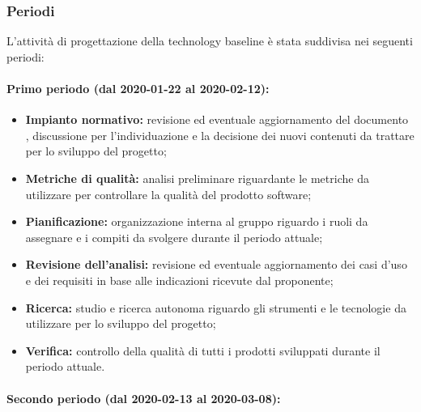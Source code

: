 			\subsubsection{Periodi}
			
				L'attività di progettazione della technology baseline è stata suddivisa nei seguenti periodi:
				
				\paragraph{Primo periodo (dal 2020-01-22 al 2020-02-12):}
				
					\begin{itemize}
					 	\item \textbf{Impianto normativo:} revisione ed eventuale aggiornamento del documento , discussione per l'individuazione e la decisione dei nuovi contenuti da trattare per lo sviluppo del progetto;
					 	\item \textbf{Metriche di qualità:} analisi preliminare riguardante le metriche da utilizzare per controllare la qualità del prodotto software;
					 	\item \textbf{Pianificazione:} organizzazione interna al gruppo riguardo i ruoli da assegnare e i compiti da svolgere durante il periodo attuale;
					 	\item \textbf{Revisione dell'analisi:} revisione ed eventuale aggiornamento dei casi d'uso e dei requisiti in base alle indicazioni ricevute dal proponente;
					 	\item \textbf{Ricerca:} studio e ricerca autonoma riguardo gli strumenti e le tecnologie da utilizzare per lo sviluppo del progetto;
					 	\item \textbf{Verifica:} controllo della qualità di tutti i prodotti sviluppati durante il periodo attuale.
					\end{itemize} 	
				
				\paragraph{Secondo periodo (dal 2020-02-13 al 2020-03-08):}
				
